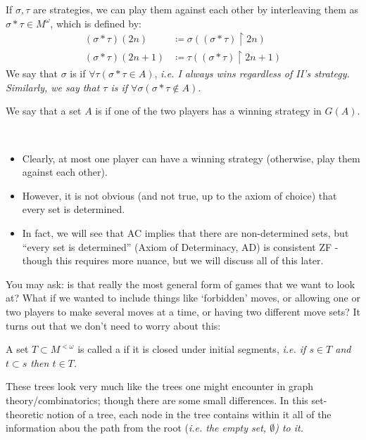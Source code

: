 \documentclass[]{article}
\newcommand{\om}{\omega}
\newcommand{\lom}{{<\omega}}
\begin{document}
If $\sigma, \tau$ are strategies, we can play them against each other by interleaving them as $\sigma\ast\tau \in M^\om$, which is defined by:
\begin{align*}
    (\sigma\ast\tau)(2n)&\coloneqq \sigma((\sigma\ast\tau)\restriction 2n)\\
    (\sigma\ast\tau)(2n+1)&\coloneqq \tau((\sigma\ast\tau)\restriction 2n+1)
\end{align*}
We say that $\sigma$ is  if $\forall \tau(\sigma\ast\tau\in A)$, \it{i.e.} I always wins regardless of II's strategy. Similarly, we say that $\tau$ is  if $\forall \sigma(\sigma\ast\tau\not\in A)$.

We say that a set $A$ is  if one of the two players has a winning strategy in $G(A)$.

\begin{remark}\ 
    \begin{itemize}
        \item Clearly, at most one player can have a winning strategy (otherwise, play them against each other).
        \item However, it is not obvious (and not true, up to the axiom of choice) that every set is determined.
        \item In fact, we will see that AC implies that there are non-determined sets, but ``every set is determined'' (Axiom of Determinacy, AD) is consistent ZF - though this requires more nuance, but we will discuss all of this later.
    \end{itemize}
\end{remark}

You may ask: is that really the most general form of games that we want to look at? What if we wanted to include things like `forbidden' moves, or allowing one or two players to make several moves at a time, or having two different move sets? It turns out that we don't need to worry about this:

A set $T\subset M^{\lom}$ is called a  if it is closed under initial segments, \it{i.e.} if $s\in T$ and $t\subset s$ then $t \in T$.

These trees look very much like the trees one might encounter in graph theory/combinatorics; though there are some small differences. In this set-theoretic notion of a tree, each node in the tree contains within it all of the information abou the path from the root (\it{i.e.} the empty set, $\emptyset$) to it.
\end{document}
